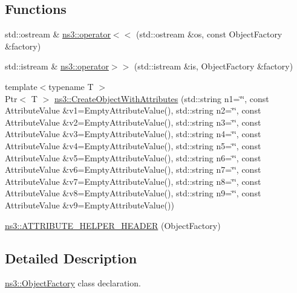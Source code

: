 \subsection*{Functions}
\begin{DoxyCompactItemize}
\item 
std\+::ostream \& \hyperlink{namespacens3_ae59476fec2f033f40e25e806cb762d3f}{ns3\+::operator$<$$<$} (std\+::ostream \&os, const Object\+Factory \&factory)
\item 
std\+::istream \& \hyperlink{namespacens3_a53802b18fd9fc0a909aaa0753a8633b5}{ns3\+::operator$>$$>$} (std\+::istream \&is, Object\+Factory \&factory)
\item 
{\footnotesize template$<$typename T $>$ }\\Ptr$<$ T $>$ \hyperlink{group__object_ga4b90e30f6cf96f37d4a646f3fc62cd06}{ns3\+::\+Create\+Object\+With\+Attributes} (std\+::string n1=\char`\"{}\char`\"{}, const Attribute\+Value \&v1=Empty\+Attribute\+Value(), std\+::string n2=\char`\"{}\char`\"{}, const Attribute\+Value \&v2=Empty\+Attribute\+Value(), std\+::string n3=\char`\"{}\char`\"{}, const Attribute\+Value \&v3=Empty\+Attribute\+Value(), std\+::string n4=\char`\"{}\char`\"{}, const Attribute\+Value \&v4=Empty\+Attribute\+Value(), std\+::string n5=\char`\"{}\char`\"{}, const Attribute\+Value \&v5=Empty\+Attribute\+Value(), std\+::string n6=\char`\"{}\char`\"{}, const Attribute\+Value \&v6=Empty\+Attribute\+Value(), std\+::string n7=\char`\"{}\char`\"{}, const Attribute\+Value \&v7=Empty\+Attribute\+Value(), std\+::string n8=\char`\"{}\char`\"{}, const Attribute\+Value \&v8=Empty\+Attribute\+Value(), std\+::string n9=\char`\"{}\char`\"{}, const Attribute\+Value \&v9=Empty\+Attribute\+Value())
\item 
\hyperlink{namespacens3_a20e8a3e56fc4b85ffbcda25997898498}{ns3\+::\+A\+T\+T\+R\+I\+B\+U\+T\+E\+\_\+\+H\+E\+L\+P\+E\+R\+\_\+\+H\+E\+A\+D\+ER} (Object\+Factory)
\end{DoxyCompactItemize}


\subsection{Detailed Description}
\hyperlink{classns3_1_1ObjectFactory}{ns3\+::\+Object\+Factory} class declaration. 